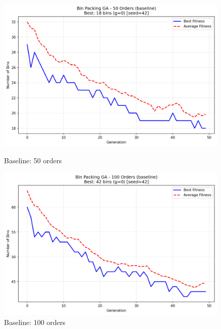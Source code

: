 \documentclass[journal,12pt,onecolumn]{IEEEtran}
\begin{document}
\begin{figure}[htbp]
\begin{minipage}{0.48\textwidth}
    \centering
    \includegraphics[width=\textwidth]{bpp_50items_baseline_seed42.png}
    \caption{Baseline: 50 orders}
    \label{fig:baseline_50}
\end{minipage}\hfill
\begin{minipage}{0.48\textwidth}
    \centering
    \includegraphics[width=\textwidth]{bpp_100items_baseline_seed42.png}
    \caption{Baseline: 100 orders}
    \label{fig:baseline_100}
\end{minipage}
\end{figure}
\end{document}
